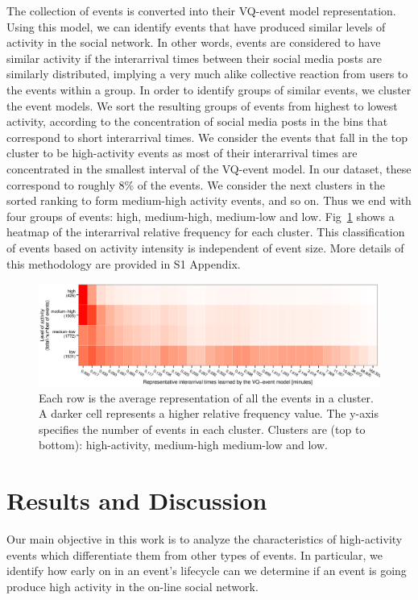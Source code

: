 The collection of events is converted into their VQ-event model
representation. Using this model, we can identify events that have
produced similar levels of activity in the social network. In other
words, events are considered to have similar activity if the
interarrival times between their social media posts are similarly
distributed, implying a very much alike collective reaction from users
to the events within a group. In order to identify groups of similar
events, we cluster the event models. We sort the resulting groups of
events from highest to lowest activity, according to the concentration
of social media posts in the bins that correspond to short
interarrival times. We consider the events that fall in the top
cluster to be high-activity events as most of their interarrival times
are concentrated in the smallest interval of the VQ-event model.  In
our dataset, these correspond to roughly 8\% of the events.  We
consider the next clusters in the sorted ranking to form medium-high
activity events, and so on.  Thus we end with four groups of events:
high, medium-high, medium-low and low. Fig~\ref{fig:fig3} shows a
heatmap of the interarrival relative frequency for each cluster. This
classification of events based on activity intensity is independent of
event size. More details of this methodology are provided in S1 Appendix.

\begin{figure}[!htb]
    \includegraphics[width=\textwidth]{PLOSONE/figures/plots_revision/fig3}
  \caption[Event representation]{{Each row is the average representation of all the
      events in a cluster.  A darker cell represents a higher
      relative frequency value.  The y-axis specifies the number of events in
      each
      cluster.  Clusters are (top to bottom): high-activity, medium-high
      medium-low and low.}
  }
  \label{fig:fig3}
\end{figure}

\section{Results and Discussion}
Our main objective in this work is to analyze the
  characteristics of high-activity events which differentiate them from
  other types of events. In particular, we identify how early on in an
  event's lifecycle can we determine if an event is going
  produce high activity in the on-line social network.

